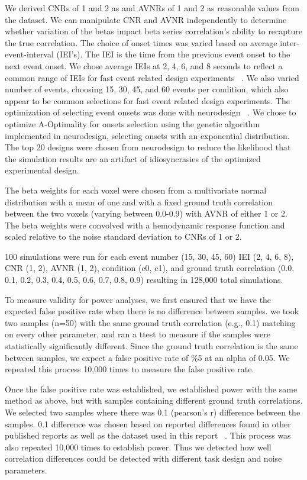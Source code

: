 \documentclass[10pt,letterpaper]{article}
\begin{document}
We derived CNRs of 1 and 2 as and AVNRs of 1 and 2 as reasonable values from the dataset.
We can manipulate CNR and AVNR independently to determine whether variation of the betas
impact beta series correlation's ability to recapture the true correlation.
The choice of onset times was varied based on average inter-event-interval (IEI's).
The IEI is the time from the previous event onset to the next event onset.
We chose average IEIs at 2, 4, 6, and 8 seconds to reflect a common range of IEIs
for fast event related design experiments ~\cite{Hennigan2015,Dichter2007,Goghari2009}.
We also varied number of events, choosing 15, 30, 45, and 60 events per condition,
which also appear to be common selections for fast event related design experiments.
The optimization of selecting event onsets was done with neurodesign ~\cite{Durnez2018}.
We chose to optimize A-Optimality for onsets selection using the genetic algorithm implemented
in neurodesign, selecting onsets with an exponential distribution.
The top 20 designs were chosen from neurodesign to reduce the likelihood
that the simulation results are an artifact of idiosyncrasies
of the optimized experimental design.

The beta weights for each voxel were chosen from a multivariate normal distribution
with a mean of one and with a fixed ground truth correlation between the two voxels 
(varying between 0.0-0.9) with AVNR of either 1 or 2.
The beta weights were convolved with a hemodynamic response function and scaled
relative to the noise standard deviation to CNRs of 1 or 2.

100 simulations were run for each event number (15, 30, 45, 60) IEI (2, 4, 6, 8), 
CNR (1, 2), AVNR (1, 2), condition (c0, c1), and ground truth correlation
(0.0, 0.1, 0.2, 0.3, 0.4, 0.5, 0.6, 0.7, 0.8, 0.9)
resulting in 128,000 total simulations.

To measure validity for power analyses, we first ensured that we have
the expected false positive rate when there is no difference between samples.
we took two samples (n=50) with the same ground truth correlation (e.g., 0.1)
matching on every other parameter, and ran a ttest to measure if the samples
were statistically significantly different.
Since the ground truth correlation is the same between samples,
we expect a false positive rate of \%5 at an alpha of 0.05.
We repeated this process 10,000 times to measure the false positive rate.

Once the false positive rate was established, we established power with the same method as above,
but with samples containing different ground truth correlations.
We selected two samples where there was 0.1 (pearson's r) difference between the samples.
0.1 difference was chosen based on reported differences found in other published
reports as well as the dataset used in this report ~\cite{Katsura2014,Lee2017,Turner2017,Lin2019,Huang2019}.
This process was also repeated 10,000 times to establish power.
Thus we detected how well correlation differences could be detected
with different task design and noise parameters.
\end{document}
